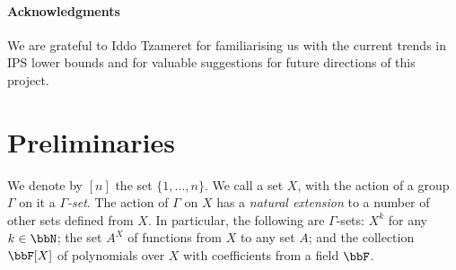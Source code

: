 \documentclass[a4paper,UKenglish,cleveref, autoref, thm-restate]{lipics-v2021}
\begin{document}
	
	\paragraph*{Acknowledgments} We are grateful to Iddo Tzameret for familiarising us with the current trends in IPS lower bounds and for valuable suggestions for future directions of this project.
	
	
	
	
	
	
	
	
	\section{Preliminaries}\label{sec:preliminaries}
	We denote by $[n]$ the set $\{1,...,n\}$.  We call a set $X$, with the action of a group $\Gamma$ on it a \emph{$\Gamma$-set}.  The action of $\Gamma$ on $X$ has a \emph{natural extension} to a number of other sets defined from $X$.  In particular, the following are $\Gamma$-sets: $X^k$ for any $k \in \bbN$; the set $A^X$ of functions from $X$ to any set $A$; and the collection $\bbF[X]$ of polynomials over $X$ with coefficients from a field $\bbF$.
	
\end{document}
